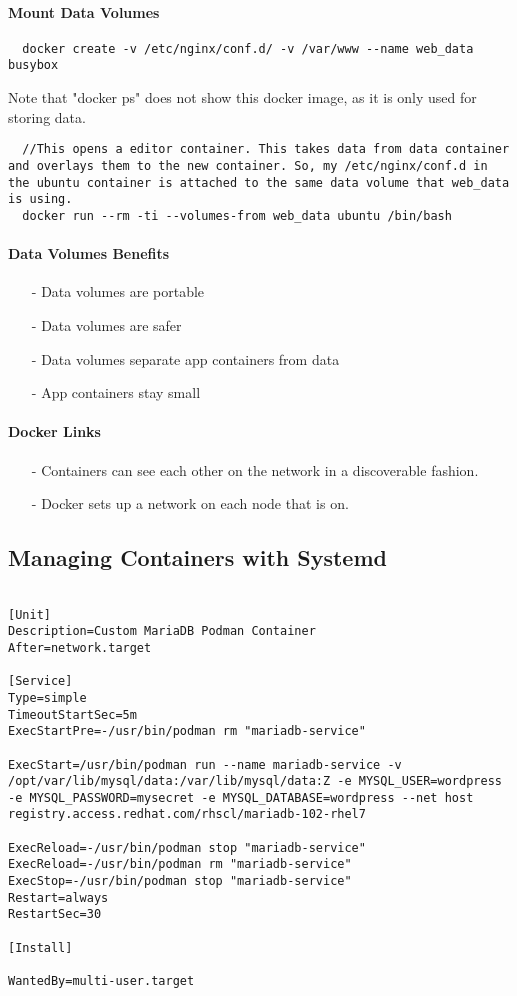 \documentclass{article}
\begin{document}
\paragraph*{Mount Data Volumes}
\begin{verbatim}
  docker create -v /etc/nginx/conf.d/ -v /var/www --name web_data busybox
\end{verbatim}
  Note that "docker ps" does not show this docker image, as it is only used for storing data.
\begin{verbatim}
  //This opens a editor container. This takes data from data container and overlays them to the new container. So, my /etc/nginx/conf.d in the ubuntu container is attached to the same data volume that web_data is using.
  docker run --rm -ti --volumes-from web_data ubuntu /bin/bash
\end{verbatim}
\paragraph{Data Volumes Benefits}
\begin{itemize}
  \item [-] Data volumes are portable
  \item [-] Data volumes are safer
  \item [-] Data volumes separate app containers from data
  \item [-] App containers stay small
\end{itemize}

\paragraph{Docker Links}
\begin{itemize}
  \item [-] Containers can see each other on the network in a discoverable fashion.
  \item [-] Docker sets up a network on each node that is on.

\end{itemize}


\subsection{Managing Containers with Systemd}
\begin{verbatim}

[Unit]
Description=Custom MariaDB Podman Container
After=network.target

[Service]
Type=simple
TimeoutStartSec=5m
ExecStartPre=-/usr/bin/podman rm "mariadb-service"

ExecStart=/usr/bin/podman run --name mariadb-service -v /opt/var/lib/mysql/data:/var/lib/mysql/data:Z -e MYSQL_USER=wordpress -e MYSQL_PASSWORD=mysecret -e MYSQL_DATABASE=wordpress --net host registry.access.redhat.com/rhscl/mariadb-102-rhel7

ExecReload=-/usr/bin/podman stop "mariadb-service"
ExecReload=-/usr/bin/podman rm "mariadb-service"
ExecStop=-/usr/bin/podman stop "mariadb-service"
Restart=always
RestartSec=30

[Install]

WantedBy=multi-user.target
\end{verbatim}
\end{document}
